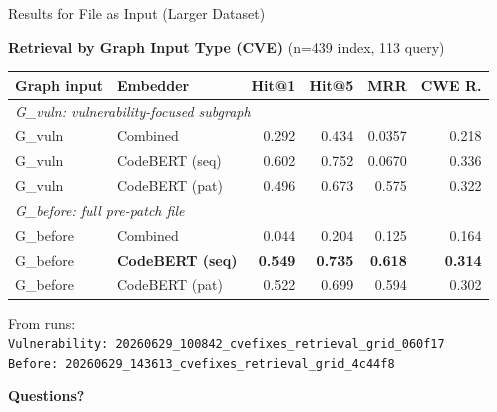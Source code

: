 \documentclass[aspectratio=169,10pt]{beamer}
\begin{document}
\begin{frame}{Results for File as Input (Larger Dataset)}


  \begin{center}
    {\small\textbf{Retrieval by Graph Input Type (CVE)} {\scriptsize(n=439 index, 113 query)} }\\[4pt]
  {\scriptsize
  \renewcommand{\arraystretch}{1.22}
  \setlength{\tabcolsep}{3.2pt}
    \begin{tabular}{llrrrr}
      \toprule
      \textbf{Graph input} & \textbf{Embedder} & \textbf{Hit@1} & \textbf{Hit@5} & \textbf{MRR} & \textbf{CWE R.} \\
      \midrule
      \multicolumn{6}{l}{\textit{G\_vuln: vulnerability-focused subgraph}} \\
      G\_vuln & Combined & 0.292 & 0.434 & 0.0357 & 0.218 \\
      G\_vuln & CodeBERT (seq) & 0.602 & 0.752 & 0.0670 & 0.336 \\
      G\_vuln & CodeBERT (pat) & 0.496 & 0.673 & 0.575 & 0.322 \\
      \midrule
      \multicolumn{6}{l}{\textit{G\_before: full pre-patch file}} \\
      G\_before & Combined & 0.044 & 0.204 & 0.125 & 0.164 \\
      G\_before & \textbf{CodeBERT (seq)} & \textbf{0.549} & \textbf{0.735} & \textbf{0.618} & \textbf{0.314} \\
      G\_before & CodeBERT (pat) & 0.522 & 0.699 & 0.594 & 0.302 \\
      \bottomrule
    \end{tabular}}

     \vspace{0.2em}
  {\scriptsize\textcolor{notecol}{From runs:\\
  \texttt{Vulnerability: 20260629\_100842\_cvefixes\_retrieval\_grid\_060f17}\\
  \texttt{Before: 20260629\_143613\_cvefixes\_retrieval\_grid\_4c44f8}}}
  \end{center}

\end{frame}


\begin{frame}[plain]
\centering
\vspace{3em}
{\LARGE\bfseries\color{c1} Questions?}\\[2em]
\end{frame}
\end{document}
